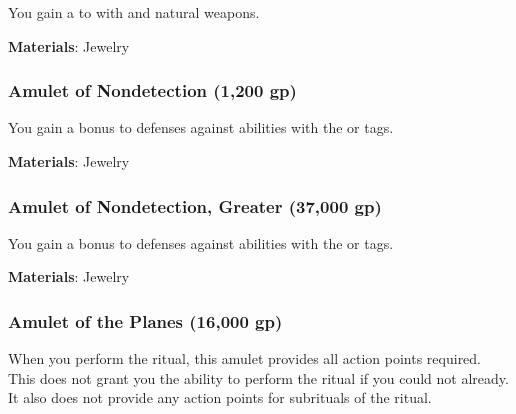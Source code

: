 You gain a   to  with  and natural weapons.



\vspace{0.25em}
\textbf{Materials}: Jewelry


\lowercase{\hypertarget{item:Amulet of Nondetection}{}}\label{item:Amulet of Nondetection}
\hypertarget{item:Amulet of Nondetection}{\subsubsection{Amulet of Nondetection\hfill{} (1,200 gp)}}

You gain a  bonus to defenses against abilities with the  or  tags.



\vspace{0.25em}
\textbf{Materials}: Jewelry


\lowercase{\hypertarget{item:Amulet of Nondetection, Greater}{}}\label{item:Amulet of Nondetection, Greater}
\hypertarget{item:Amulet of Nondetection, Greater}{\subsubsection{Amulet of Nondetection, Greater\hfill{} (37,000 gp)}}

You gain a  bonus to defenses against abilities with the  or  tags.



\vspace{0.25em}
\textbf{Materials}: Jewelry


\lowercase{\hypertarget{item:Amulet of the Planes}{}}\label{item:Amulet of the Planes}
\hypertarget{item:Amulet of the Planes}{\subsubsection{Amulet of the Planes\hfill{} (16,000 gp)}}

When you perform the  ritual, this amulet provides all action points required.
This does not grant you the ability to perform the  ritual if you could not already.
It also does not provide any action points for subrituals of the  ritual.



